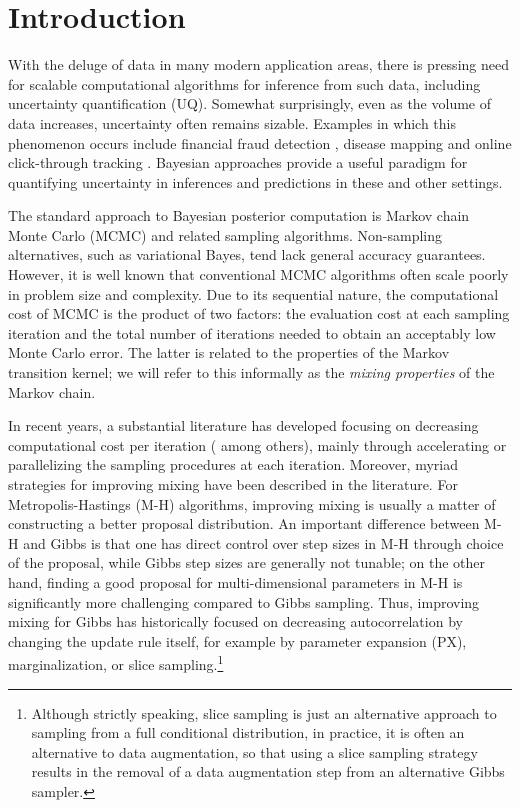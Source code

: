 \documentclass[12pt]{article}
\begin{document}
\section{Introduction}

With the deluge of data in many modern application areas, there is pressing need for scalable computational algorithms for inference from such data, including uncertainty quantification (UQ).  Somewhat surprisingly, even as the volume of data increases, uncertainty often remains sizable.  Examples in which this phenomenon occurs include financial fraud detection \citep{ngai2011application}, disease mapping \citep{wakefield2007disease} and online click-through tracking \citep{wang2010click}.  Bayesian approaches provide a useful paradigm for quantifying uncertainty in inferences and predictions in these and other settings.

The standard approach to Bayesian posterior computation is Markov chain Monte Carlo (MCMC) and related sampling algorithms. Non-sampling alternatives, such as variational Bayes, tend lack general accuracy guarantees. However, it is well known that conventional MCMC algorithms often scale poorly in problem size and complexity. Due to its sequential nature, the computational cost of MCMC is the product of two factors: the evaluation cost at each sampling iteration and the total number of iterations needed to obtain an acceptably low Monte Carlo error. The latter is related to the properties of the Markov transition kernel; we will refer to this informally as the \emph{mixing properties} of the Markov chain. 

In recent years, a substantial literature has developed focusing on decreasing computational cost per iteration (\cite{minsker2014robust,srivastava2015wasp,conrad2015accelerating} among others), mainly through accelerating or parallelizing the sampling procedures at each iteration. Moreover, myriad strategies for improving mixing have been described in the literature. For Metropolis-Hastings (M-H) algorithms, improving mixing is usually a matter of constructing a better proposal distribution. An important difference between M-H and Gibbs is that one has direct control over step sizes in M-H through choice of the proposal, while Gibbs step sizes are generally not tunable; on the other hand, finding a good proposal for multi-dimensional parameters in M-H is significantly more challenging compared to Gibbs sampling. Thus, improving mixing for Gibbs has historically focused on decreasing autocorrelation by changing the update rule itself, for example by parameter expansion (PX), marginalization, or slice sampling.\footnote{Although strictly speaking, slice sampling is just an alternative approach to sampling from a full conditional distribution, in practice, it is often an alternative to data augmentation, so that using a slice sampling strategy results in the removal of a data augmentation step from an alternative Gibbs sampler.} 
\end{document}
